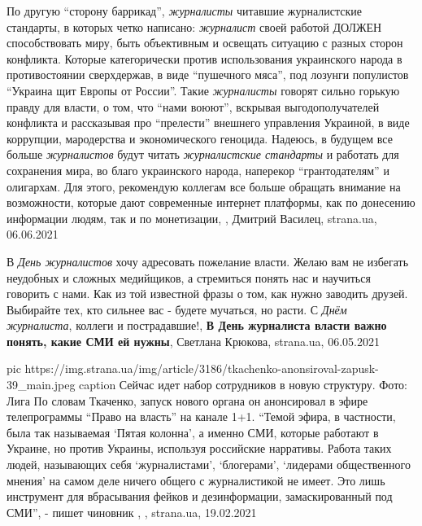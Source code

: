 По другую \enquote{сторону баррикад}, \emph{журналисты} читавшие журналистские стандарты, в
которых четко написано: \emph{журналист} своей работой ДОЛЖЕН способствовать миру,
быть объективным и освещать ситуацию с разных сторон конфликта. Которые
категорически против использования украинского народа в противостоянии
сверхдержав, в виде \enquote{пушечного мяса}, под лозунги популистов \enquote{Украина щит
Европы от России}. Такие \emph{журналисты} говорят сильно горькую правду для власти, о
том, что \enquote{нами воюют}, вскрывая выгодополучателей конфликта и рассказывая про
\enquote{прелести} внешнего управления Украиной, в виде коррупции, мародерства и
экономического геноцида.  Надеюсь, в будущем все больше \emph{журналистов} будут
читать \emph{журналистские стандарты} и работать для сохранения мира, во благо
украинского народа, наперекор \enquote{грантодателям} и олигархам.  Для этого,
рекомендую коллегам все больше обращать внимание на возможности, которые дают
современные интернет платформы, как по донесению информации людям, так и по
монетизации,
, 
Дмитрий Василец, strana.ua, 06.06.2021

В \emph{День журналистов} хочу адресовать пожелание власти. Желаю вам не
избегать неудобных и сложных медийщиков, а стремиться понять нас и научиться
говорить с нами. Как из той известной фразы о том, как нужно заводить друзей.
Выбирайте тех, кто сильнее вас - будете мучаться, но расти.  С \emph{Днём
журналиста}, коллеги и пострадавшие!, 
\textbf{В День журналиста власти важно понять, какие СМИ ей нужны},
Светлана Крюкова, strana.ua, 06.05.2021

\ifcmt
  pic https://img.strana.ua/img/article/3186/tkachenko-anonsiroval-zapusk-39_main.jpeg
	caption Сейчас идет набор сотрудников в новую структуру. Фото: Лига 
\fi
По словам Ткаченко, запуск нового органа он анонсировал в эфире телепрограммы
\enquote{Право на власть} на канале 1+1.  \enquote{Темой эфира, в частности,
была так называемая \enquote{Пятая колонна}, а именно СМИ, которые работают в
Украине, но против Украины, используя российские нарративы.  Работа таких
людей, называющих себя \enquote{журналистами}, \enquote{блогерами},
\enquote{лидерами общественного мнения} на самом деле ничего общего с
журналистикой не имеет. Это лишь инструмент для вбрасывания фейков и
дезинформации, замаскированный под СМИ}, - пишет чиновник
, 
, strana.ua, 19.02.2021



